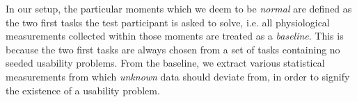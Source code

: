 In our setup, the particular moments which we deem to be \textit{normal} are defined as the two first tasks the test
participant is asked to solve, i.e. all physiological measurements collected within those moments are treated as a
\textit{baseline}. This is because the two first tasks are always chosen from a set of tasks containing no seeded
usability problems. From the baseline, we extract various statistical measurements from which \textit{unknown} data
should deviate from, in order to signify the existence of a usability problem.

